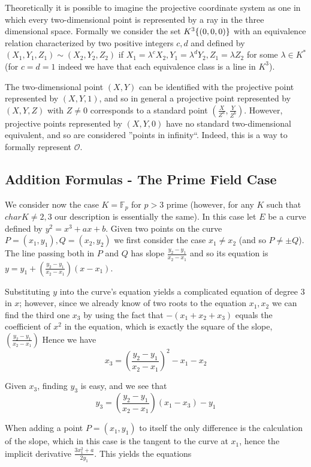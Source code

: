 \documentclass[11pt,english]{article}
\begin{document}
Theoretically it is possible to imagine the projective coordinate system as one in which every two-dimensional point is represented by a ray in the three
dimensional space. Formally we consider the set $K^3\\\{(0,0,0)\}$ with an equivalence relation characterized by two positive integers $c,d$ and
defined by $(X_1,Y_1,Z_1)\sim (X_2,Y_2,Z_2)$ if $X_1=\lambda^cX_2,Y_1=\lambda^dY_2,Z_1=\lambda Z_2$ for some $\lambda\in K^*$ (for $c=d=1$
indeed we have that each equivalence class is a line in $K^3$).

The two-dimensional point $(X,Y)$ can be identified with the projective point represented by $(X,Y,1)$, and so in general a projective point represented by
$(X,Y,Z)$ with $Z\ne 0$ corresponds to a standard point $(\frac{X}{Z^a},\frac{Y}{Z^b})$. However, projective points represented by $(X,Y,0)$
have no standard two-dimensional equivalent, and so are considered ''points in infinity``. Indeed, this is a way to formally represent $\mathcal{O}$.

\subsection{Addition Formulas - The Prime Field Case}
We consider now the case $K=\mathbb{F}_p$ for $p>3$ prime (however, for any $K$ such that $char K\ne 2,3$ our description is essentially the same).
In this case let $E$ be a curve defined by $y^2=x^3+ax+b$. Given two points on the curve $P=(x_1,y_1),Q=(x_2,y_2)$ we first consider the case $x_1\ne x_2$
(and so $P\ne\pm Q$). The line passing both in $P$ and $Q$ has slope $\frac{y_2-y_1}{x_2-x_1}$ and so its equation is $y=y_1+\left(\frac{y_2-y_1}{x_2-x_1}\right)(x-x_1)$.


Substituting $y$ into the curve's equation yields a complicated equation of degree 3 in $x$; however, since we already know of two roots to the equation $x_1,x_2$
we can find the third one $x_3$ by using the fact that $-(x_1+x_2+x_3)$ equals the coefficient of $x^2$ in the equation, which is exactly the square of the slope, $\left(\frac{y_2-y_1}{x_2-x_1}\right)$ 
Hence we have $$x_3=\left(\frac{y_2-y_1}{x_2-x_1}\right)^2-x_1-x_2$$

Given $x_3$, finding $y_3$ is easy, and we see that $$y_3=\left(\frac{y_2-y_1}{x_2-x_1}\right)(x_1-x_3)-y_1$$

When adding a point $P=(x_1,y_1)$ to itself the only difference is the calculation of the slope, which in this case is the tangent to the curve at $x_1$, hence
the implicit derivative $\frac{3x_1^2+a}{2y_1}$. This yields the equations 
\end{document}
